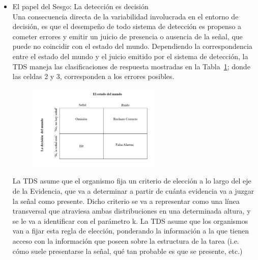 \begin{itemize}
El soporte de las distribuciones -identificado en la Figura~\ref{fig:Overlap} bajo el nombre de ‘Evidencia’ ( y en las Figuras~\ref{fig:Senal_presentacion} y \ref{fig:Noise}, como 'Puntaje en prueba clínica' e 'Intensidad' en la Figura~\ref{fig:Senal_percepcion}- rara vez se define con precisión,  teniendo una concepción más bien abstracta; La idea general es que cuando queremos detectar una señal particular, comenzamos a recolectar un tipo de evidencia específico a la tarea ante la que nos encontramos. Lo más importante, es que la señal siempre va a estar asociada en mayor medida con dicha evidencia, distribuyéndose siempre en valores situados por encima (a la derecha, en la Figura 1) del ruido.\\
 
  \item{El papel del Sesgo: La detección es decisión}\\

Una consecuencia directa de la variabilidad involucrada en el entorno de decisión, es que el desempeño de todo sistema de detección es propenso a cometer errores y emitir un juicio de presencia o ausencia de la señal, que puede no coincidir con el estado del mundo. Dependiendo la correspondencia entre el estado del mundo y el juicio emitido por el sistema de detección, la TDS maneja las clasificaciones de respuesta mostradas en la Tabla~\ref{fig:Mat_Output}; donde las celdas 2 y 3, corresponden a los errores posibles.\\

\begin{figure}[th]
\centering
\includegraphics[width=0.60\textwidth]{Figures/Matriz_Outputs} 
\caption[Posibles Resultados en una Tarea de Detección]{}
\label{fig:Mat_Output}
\end{figure}

La TDS asume que el organismo fija un criterio de elección a lo largo del eje de la Evidencia, que va a determinar a partir de cuánta evidencia va a juzgar la señal como presente. Dicho criterio se va a representar como una línea transversal que atraviesa ambas distribuciones en una determinada altura, y se le va a identificar con el parámetro k. La TDS asume que los organismos van a fijar esta regla de elección, ponderando la información a la que tienen acceso con la información que poseen sobre la estructura de la tarea (i.e. cómo suele presentarse la señal, qué tan probable es que se presente, etc.)\\



\end{itemize}
